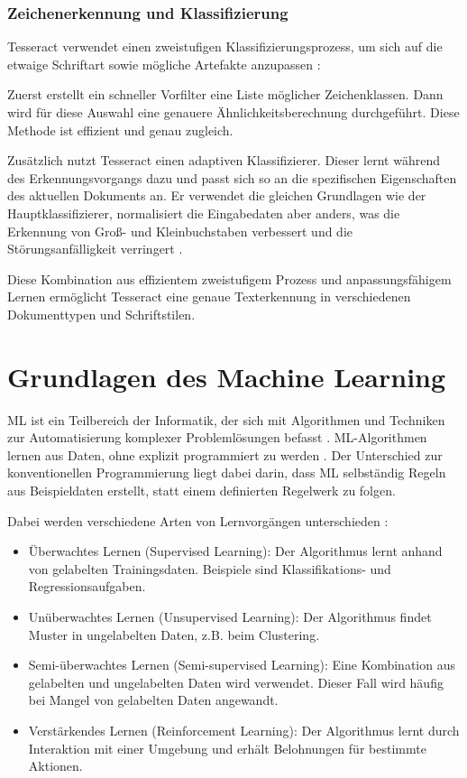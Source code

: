 \subsubsection{Zeichenerkennung und Klassifizierung}
\label{subsubsec:zeichenerkennung-und-klassifizierung}
Tesseract verwendet einen zweistufigen Klassifizierungsprozess, um sich auf die etwaige Schriftart sowie mögliche Artefakte anzupassen \cite{SmithR_2007_AOot}:

Zuerst erstellt ein schneller Vorfilter eine Liste möglicher Zeichenklassen. Dann wird für diese Auswahl eine genauere Ähnlichkeitsberechnung durchgeführt. Diese Methode ist effizient und genau zugleich. 

Zusätzlich nutzt Tesseract einen adaptiven Klassifizierer. Dieser lernt während des Erkennungsvorgangs dazu und passt sich so an die spezifischen Eigenschaften des aktuellen Dokuments an. Er verwendet die gleichen Grundlagen wie der Hauptklassifizierer, normalisiert die Eingabedaten aber anders, was die Erkennung von Groß- und Kleinbuchstaben verbessert und die Störungsanfälligkeit verringert \cite{SmithR_2007_AOot}.

Diese Kombination aus effizientem zweistufigem Prozess und anpassungsfähigem Lernen ermöglicht Tesseract eine genaue Texterkennung in verschiedenen Dokumenttypen und Schriftstilen.

\section{Grundlagen des Machine Learning}
\label{sec:machine-learning-grundlagen}
 \gls{ML} ist ein Teilbereich der Informatik, der sich mit Algorithmen und Techniken zur Automatisierung komplexer Problemlösungen befasst \cite{RebalaGopinath2019AItM}. \gls{ML}-Algorithmen lernen aus Daten, ohne explizit programmiert zu werden \cite{RebalaGopinath2019AItM}. Der Unterschied zur konventionellen Programmierung liegt dabei darin, dass \gls{ML} selbständig Regeln aus Beispieldaten erstellt, statt einem definierten Regelwerk zu folgen.

Dabei werden verschiedene Arten von Lernvorgängen unterschieden \cite{RebalaGopinath2019AItM, jordan2015machine}:
\begin{itemize}
    \item Überwachtes Lernen (Supervised Learning): Der Algorithmus lernt anhand von gelabelten Trainingsdaten. Beispiele sind Klassifikations- und Regressionsaufgaben.
    \item Unüberwachtes Lernen (Unsupervised Learning): Der Algorithmus findet Muster in ungelabelten Daten, z.B. beim Clustering.
    \item Semi-überwachtes Lernen (Semi-supervised Learning): Eine Kombination aus gelabelten und ungelabelten Daten wird verwendet. Dieser Fall wird häufig bei Mangel von gelabelten Daten angewandt.
    \item Verstärkendes Lernen (Reinforcement Learning): Der Algorithmus lernt durch Interaktion mit einer Umgebung und erhält Belohnungen für bestimmte Aktionen.
\end{itemize}

